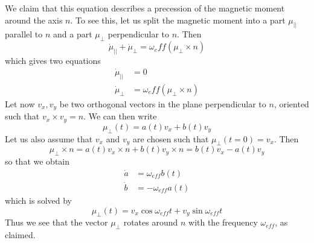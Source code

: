 \documentclass[a4paper, draft]{article}
\theoremstyle{own}
\theoremstyle{remark}
\begin{document}
We claim that this equation describes a precession of the magnetic moment around the axis $n$. To see this, let us split the magnetic moment into a part $\mu_{||}$ parallel to $n$ and a part $\mu_{\perp}$ perpendicular to $n$. Then
$$
\dot{\mu}_{||} + \dot{\mu}_{\perp} = \omega_eff (\mu_{\perp} \times n)
$$
which gives two equations
\begin{align*}
\dot{\mu}_{||} &= 0 \\
\dot{\mu}_{\perp} &= \omega_eff (\mu_{\perp} \times n)
\end{align*}
Let now $v_x, v_y$ be two orthogonal vectors in the plane perpendicular to $n$, oriented such that $v_x \times v_y = n$. We can then write
$$
\mu_{\perp} (t) = a(t) v_x + b(t) v_y
$$
Let us also assume that $v_x$ and $v_y$ are chosen such that $\mu_{\perp}(t=0) = v_x$. Then 
$$
\mu_{\perp} \times n = a(t) v_x \times n + b(t) v_y \times n = b(t) v_x - a(t) v_y 
$$
so that we obtain
\begin{align*}
\dot{a} &= \omega_{eff} b(t)  \\
\dot{b} &= - \omega_{eff} a(t)  
\end{align*}
which is solved by
$$
\mu_{\perp} (t) = 
v_x \cos \omega_{eff} t  +  v_y \sin \omega_{eff} t 
$$
Thus we see that the vector $\mu_{\perp}$ rotates around $n$ with the frequency $\omega_{eff}$, as claimed. 
\end{document}
